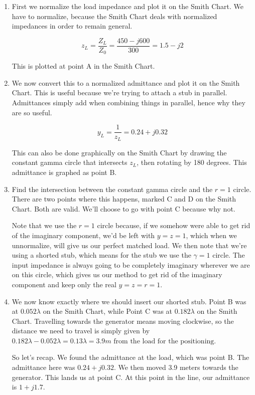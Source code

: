\documentclass{article}
\begin{document}
\begin{enumerate}
    \item First we normalize the load impedance and plot it on the Smith Chart. We have to normalize, because the Smith Chart deals with normalized impedances in order to remain general.

    $$z_L = \frac{Z_L}{Z_0} = \frac{450 - j600}{300} = 1.5 - j2$$

    This is plotted at point A in the Smith Chart.

    \item We now convert this to a normalized admittance and plot it on the Smith Chart. This is useful because we're trying to attach a stub in parallel. Admittances simply add when combining things in parallel, hence why they are so useful.

    $$y_L = \frac{1}{z_L} = 0.24 + j0.32$$

    This can also be done graphically on the Smith Chart by drawing the constant gamma circle that intersects $z_L$, then rotating by 180 degrees. This admittance is graphed as point B.

    \item Find the intersection between the constant gamma circle and the $r = 1$ circle. There are two points where this happens, marked C and D on the Smith Chart. Both are valid. We'll choose to go with point C because why not.

    Note that we use the $r = 1$ circle because, if we somehow were able to get rid of the imaginary component, we'd be left with $y = z = 1$, which when we unnormalize, will give us our perfect matched load. We then note that we're using a shorted stub, which means for the stub we use the $\gamma = 1$ circle. The input impedance is always going to be completely imaginary wherever we are on this circle, which gives us our method to get rid of the imaginary component and keep only the real $y = z = r = 1$.

    \item We now know exactly where we should insert our shorted stub. Point B was at $0.052\lambda$ on the Smith Chart, while Point C was at $0.182 \lambda$ on the Smith Chart. Travelling towards the generator means moving clockwise, so the distance we need to travel is simply given by $0.182 \lambda - 0.052 \lambda = 0.13 \lambda = \boxed{3.9 m \text{ from the load for the positioning}}$.

    So let's recap. We found the admittance at the load, which was point B. The admittance here was $0.24 + j0.32$. We then moved 3.9 meters towards the generator. This lands us at point C. At this point in the line, our admittance is $1 + j1.7$. 


\end{enumerate}
\end{document}
